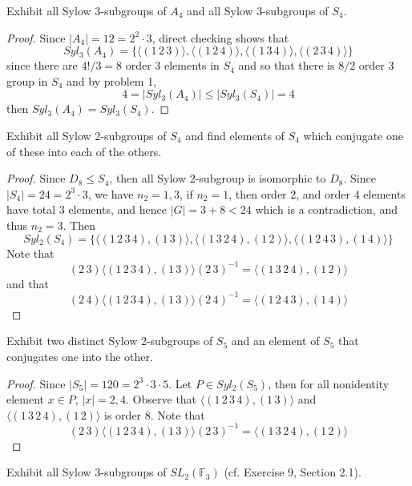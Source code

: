 \documentclass{article}
\newenvironment{problem}[2][Problem]{\begin{trivlist}
\item[\hskip \labelsep {\bfseries #1}\hskip \labelsep {\bfseries #2.}]}{\end{trivlist}}
\begin{document}
\begin{problem}{6}
    Exhibit all Sylow 3-subgroups of $A_4$ and all Sylow 3-subgroups of $S_4$.
\end{problem}
\begin{proof}
    Since $|A_4|=12=2^2\cdot 3$, direct checking shows that 
    \[
    Syl_3(A_4)=\{\langle (1\, 2\, 3)\rangle,\langle (1\, 2\, 4)\rangle,\langle (1\, 3\, 4)\rangle, \langle (2\, 3\, 4)\rangle\}
    \]
    since there are $4!/3=8$ order $3$ elements in $S_4$ and so that there is $8/2$ order 3 group in $S_4$ and by problem 1, 
    \[
    4=|Syl_3(A_4)|\leq |Syl_3(S_4)|=4
    \]
    then $Syl_3(A_4)=Syl_3(S_4)$.
\end{proof}
\begin{problem}{7}
    Exhibit all Sylow 2-subgroups of $S_4$ and find elements of $S_4$ which conjugate one of these into each of the others. 
\end{problem}
\begin{proof}
    Since $D_8 \leq S_4$, then all Sylow $2$-subgroup is isomorphic to $D_8$. Since $|S_4|=24=2^3\cdot 3$, we have $n_2=1, 3$, if $n_2=1$, then order 2, and order 4 elements have total 3 elements, and hence $|G|=3+8<24$ which is a contradiction, and thus $n_2=3$. Then 
    \[
    Syl_2(S_4)=\{\langle(1\, 2\, 3\, 4), (1\, 3) \rangle, \langle(1\, 3\, 2\, 4), (1\, 2) \rangle, \langle(1\, 2\, 4\, 3), (1\, 4) \rangle\}
    \]
    Note that 
    \[
       (2\, 3) \langle(1\, 2\, 3\, 4), (1\, 3) \rangle (2\, 3)^{-1}=\langle(1\, 3\, 2\, 4), (1\, 2) \rangle
    \]
    and that 
    \[
        (2\, 4)\langle(1\, 2\, 3\, 4), (1\, 3) \rangle(2\, 4)^{-1}= \langle(1\, 2\, 4\, 3), (1\, 4) \rangle
    \]
\end{proof}
\begin{problem}{8}
    Exhibit two distinct Sylow 2-subgroups of $S_5$ and an element of $S_5$ that conjugates one into the other.
\end{problem}
\begin{proof}
    Since $|S_5|=120=2^{3}\cdot 3 \cdot 5$. Let $P\in Syl_2(S_5)$, then for all nonidentity element $x \in P$, $|x|=2, 4$. Observe that  $\langle(1\, 2\, 3\, 4), (1\, 3) \rangle$ and $\langle(1\, 3\, 2\, 4), (1\, 2) \rangle$ is order $8$. 
        Note that 
    \[
       (2\, 3) \langle(1\, 2\, 3\, 4), (1\, 3) \rangle (2\, 3)^{-1}=\langle(1\, 3\, 2\, 4), (1\, 2) \rangle
    \]
\end{proof}
\begin{problem}{9}
    Exhibit all Sylow 3-subgroups of $SL_2(\mathbb{F}_3)$ (cf. Exercise 9, Section 2.1).
\end{problem}
\end{document}
